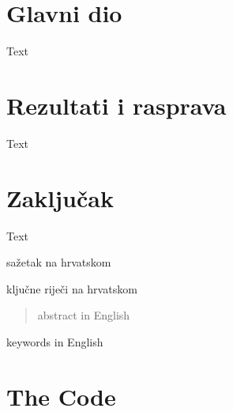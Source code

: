 \documentclass[zavrsnirad]{fer}
\begin{document}
	\chapter{Glavni dio}
	\label{pog:glavni_dio}
	
	Text
	
	
	\chapter{Rezultati i rasprava}
	\label{pog:rezultati_i_rasprava}
	
	Text
	
	
	\chapter{Zaključak}
	\label{pog:zakljucak}
	
	Text
	
	
	
	
	\begin{sazetak}
		sažetak na hrvatskom
	\end{sazetak}
	\begin{kljucnerijeci}
		ključne riječi na hrvatskom
	\end{kljucnerijeci}
	\begin{abstract}
		abstract in English
	\end{abstract}
	\begin{keywords}
		keywords in English
	\end{keywords}
	
	\backmatter
	\chapter{The Code}
\end{document}

